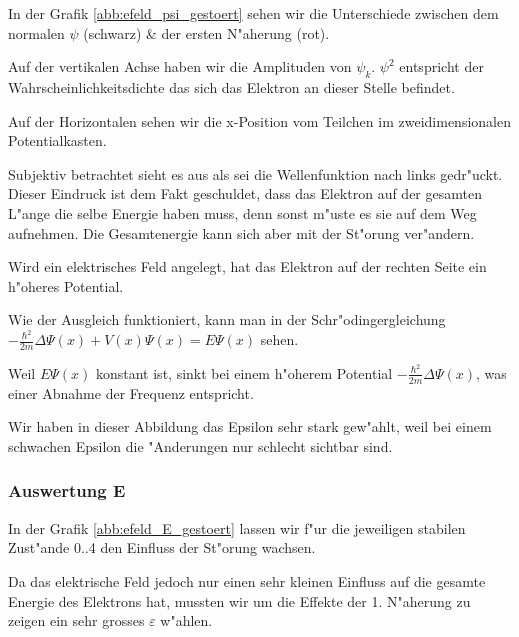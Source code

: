 \begin{refsection}
In der Grafik \ref{abb:efeld_psi_gestoert} sehen wir die Unterschiede zwischen dem normalen $\psi$ (schwarz) \& der ersten N"aherung (rot).

Auf der vertikalen Achse haben wir die Amplituden von $\psi_k$.
$\psi^2$ entspricht der Wahrscheinlichkeitsdichte das sich das Elektron an dieser Stelle befindet.

Auf der Horizontalen sehen wir die x-Position vom Teilchen im zweidimensionalen Potentialkasten.

Subjektiv betrachtet sieht es aus als sei die Wellenfunktion nach links gedr"uckt.
Dieser Eindruck ist dem Fakt geschuldet, dass das Elektron auf der gesamten L"ange die selbe Energie haben muss,
denn sonst m"uste es sie auf dem Weg aufnehmen. Die Gesamtenergie kann sich aber mit der St"orung ver"andern.

Wird ein elektrisches Feld angelegt, hat das Elektron auf der rechten Seite ein h"oheres Potential.

Wie der Ausgleich funktioniert, kann man in der Schr"odingergleichung 
$
-\frac{\hbar^2}{2m}\Delta\Psi(x) + V(x)\Psi(x)
=
E\Psi(x)
$ sehen.

Weil $E\Psi(x)$ konstant ist, sinkt bei einem h"oherem Potential $-\frac{\hbar^2}{2m}\Delta\Psi(x)$,
was einer Abnahme der Frequenz entspricht.

Wir haben in dieser Abbildung das Epsilon sehr stark gew"ahlt,
weil bei einem schwachen Epsilon die "Anderungen nur schlecht sichtbar sind.



\subsubsection{Auswertung E}

In der Grafik \ref{abb:efeld_E_gestoert} lassen wir f"ur die jeweiligen stabilen Zust"ande 0..4 
den Einfluss der St"orung wachsen.

Da das elektrische Feld jedoch nur einen sehr kleinen Einfluss auf die gesamte Energie des 
Elektrons hat, mussten wir um die Effekte der 1. N"aherung zu zeigen ein sehr grosses $\varepsilon$
w"ahlen.


\end{refsection}
